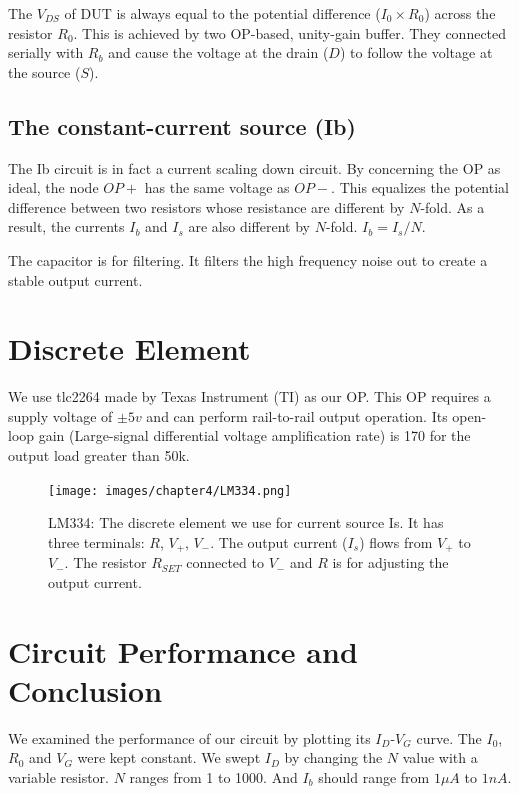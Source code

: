 The $V_{DS}$ of DUT is always equal to the potential difference ($I_0 \times R_0$) across the resistor $R_0$.
This is achieved by two OP-based, unity-gain buffer.
They connected serially with $R_b$ and cause the voltage at the drain ($D$) to follow the voltage at the source ($S$).


\subsection*{The  constant-current source (Ib)}
The Ib circuit is in fact a current scaling down circuit.
By concerning the OP as ideal, the node $OP+$ has the same voltage as $OP-$.
This equalizes the potential difference between two resistors whose resistance are different by $N$-fold.
As a result, the currents $I_b$ and $I_s$ are also different by $N$-fold.
$I_b = I_s / N$.

The capacitor is for filtering. It filters the high frequency noise out to create a stable output current.


\section{Discrete Element}
We use tlc2264 made by Texas Instrument (TI) as our OP.
This OP requires a supply voltage of $\pm 5v$ and can perform rail-to-rail output operation.
Its open-loop gain (Large-signal differential voltage amplification rate) is 170 for the output load greater than 50k.

\begin{figure}[tb!hp]
    \centering
    \texttt{[image: images/chapter4/LM334.png]}
    \caption{LM334: The discrete element we use for current source Is. It has three terminals: $R$, $V_+$, $V_-$. The output current ($I_s$) flows from $V_+$ to $V_-$. The resistor $R_{SET}$ connected to $V_-$ and $R$ is for adjusting the output current.}
    \label{fig:lm334}
\end{figure}



\section{Circuit Performance and Conclusion}
We examined the performance of our circuit by plotting its $I_D$-$V_G$ curve.
The $I_0$, $R_0$ and $V_G$ were kept constant.
We swept $I_D$ by changing the $N$ value with a variable resistor.
$N$ ranges from 1 to 1000.
And $I_b$ should range from $1\mu A$ to $1n A$.

